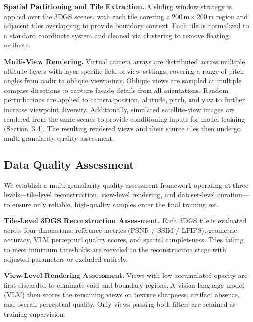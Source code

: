 \documentclass{llmxive}
\providecommand{\paragraph}[1]{\noindent\textbf{#1.}\hspace*{1em}}
\begin{document}
\paragraph{Spatial Partitioning and Tile Extraction}
A sliding window strategy is applied over the 3DGS scenes, with each tile covering a $200\,\text{m} \times 200\,\text{m}$ region and adjacent tiles overlapping to provide boundary context. Each tile is normalized to a standard coordinate system and cleaned via clustering to remove floating artifacts.

\paragraph{Multi-View Rendering}
Virtual camera arrays are distributed across multiple altitude layers with layer-specific field-of-view settings, covering a range of pitch angles from nadir to oblique viewpoints. Oblique views are sampled at multiple compass directions to capture facade details from all orientations. Random perturbations are applied to camera position, altitude, pitch, and yaw to further increase viewpoint diversity. Additionally, simulated satellite-view images are rendered from the same scenes to provide conditioning inputs for model training (Section~3.4). The resulting rendered views and their source tiles then undergo multi-granularity quality assessment.

\subsection{Data Quality Assessment}
\label{sec:quality}

We establish a multi-granularity quality assessment framework operating at three levels---tile-level reconstruction, view-level rendering, and dataset-level curation---to ensure only reliable, high-quality samples enter the final training set.

\paragraph{Tile-Level 3DGS Reconstruction Assessment}
Each 3DGS tile is evaluated across four dimensions: reference metrics (PSNR / SSIM / LPIPS), geometric accuracy, VLM perceptual quality scores, and spatial completeness. Tiles failing to meet minimum thresholds are recycled to the reconstruction stage with adjusted parameters or excluded entirely.

\paragraph{View-Level Rendering Assessment}
Views with low accumulated opacity are first discarded to eliminate void and boundary regions. A vision-language model (VLM) then scores the remaining views on texture sharpness, artifact absence, and overall perceptual quality. Only views passing both filters are retained as training supervision.
\end{document}
